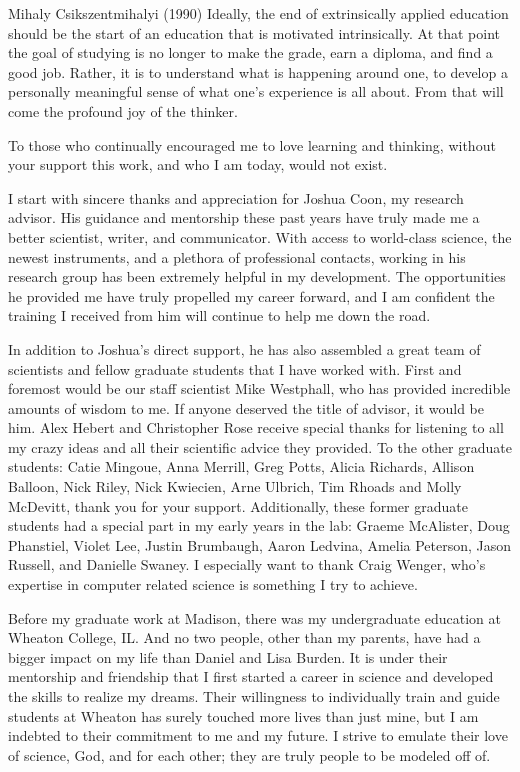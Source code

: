 \begin{wbepi}{Mihaly Csikszentmihalyi (1990)}
Ideally, the end of extrinsically applied education should be the start of an education that is motivated intrinsically. At that point the goal of studying is no longer to make the grade, earn a diploma, and find a good job. Rather, it is to understand what is happening around one, to develop a personally meaningful sense of what one's experience is all about. From that will come the profound joy of the thinker.
\end{wbepi}

To those who continually encouraged me to love learning and thinking, without your support this work, and who I am today, would not exist.

I start with sincere thanks and appreciation for Joshua Coon, my research advisor. His guidance and mentorship these past years have truly made me a better scientist, writer, and communicator. With access to world-class science, the newest instruments, and a plethora of professional contacts, working in his research group has been extremely helpful in my development. The opportunities he provided me have truly propelled my career forward, and I am confident the training I received from him will continue to help me down the road.

In addition to Joshua's direct support, he has also assembled a great team of scientists and fellow graduate students that I have worked with. First and foremost would be our staff scientist Mike Westphall, who has provided incredible amounts of wisdom to me. If anyone deserved the title of advisor, it would be him. Alex Hebert and Christopher Rose receive special thanks for listening to all my crazy ideas and all their scientific advice they provided. To the other graduate students: Catie Mingoue, Anna Merrill, Greg Potts, Alicia Richards, Allison Balloon, Nick Riley, Nick Kwiecien, Arne Ulbrich, Tim Rhoads and Molly McDevitt, thank you for your support. Additionally, these former graduate students had a special part in my early years in the lab: Graeme McAlister, Doug Phanstiel, Violet Lee, Justin Brumbaugh, Aaron Ledvina, Amelia Peterson, Jason Russell, and Danielle Swaney. I especially want to thank Craig Wenger, who's expertise in computer related science is something I try to achieve.

Before my graduate work at Madison, there was my undergraduate education at Wheaton College, IL. And no two people, other than my parents, have had a bigger impact on my life than Daniel and Lisa Burden. It is under their mentorship and friendship that I first started a career in science and developed the skills to realize my dreams. Their willingness to individually train and guide students at Wheaton has surely touched more lives than just mine, but I am indebted to their commitment to me and my future. I strive to emulate their love of science, God, and for each other; they are truly people to be modeled off of.

